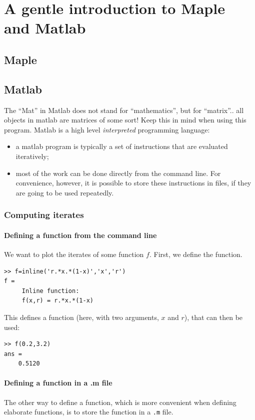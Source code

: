 \chapter{A gentle introduction to Maple and Matlab}
\label{chap:matlab}


\section{Maple}

\section{Matlab}
The ``Mat'' in Matlab does not stand for ``mathematics'', but for ``matrix''..
all objects in matlab are matrices of some sort! Keep this in mind when using this program.
Matlab is a high level \emph{interpreted} programming language: 
\begin{itemize}
\item a matlab program is typically a set of instructions that are evaluated iteratively;
\item most of the work can be done directly from the command line. For convenience, however, it is possible to store these instructions in files, if they are going to be used repeatedly.
\end{itemize}

\subsection{Computing iterates}

\subsubsection{Defining a function from the command line}
We want to plot the iterates of some function $f$. First, we define the function.
\begin{verbatim}
>> f=inline('r.*x.*(1-x)','x','r')
f =
     Inline function:
     f(x,r) = r.*x.*(1-x)
\end{verbatim}
This defines a function (here, with two arguments, $x$ and $r$), that can then be used:
\begin{verbatim}
>> f(0.2,3.2)
ans =
    0.5120
\end{verbatim}

\subsubsection{Defining a function in a .m file}
The other way to define a function, which is more convenient when defining elaborate functions, is to store the function in a {\tt .m} file.

